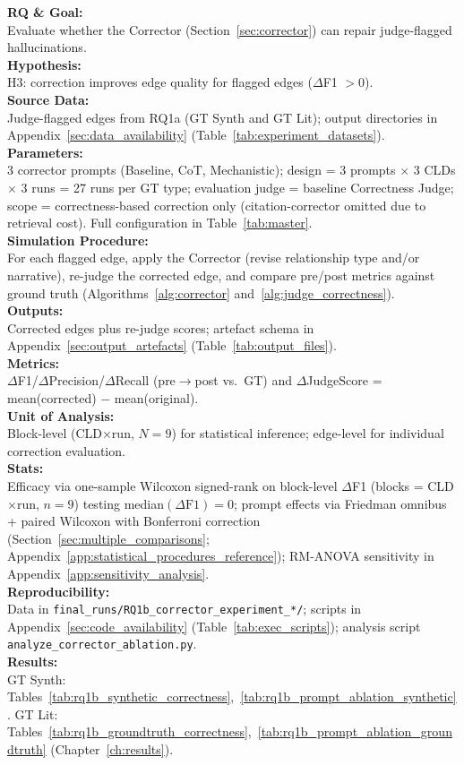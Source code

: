 \noindent\textbf{RQ \& Goal:}\\
Evaluate whether the Corrector (Section~\ref{sec:corrector}) can repair judge-flagged hallucinations.\\
\textbf{Hypothesis:}\\
H3: correction improves edge quality for flagged edges ($\Delta$F1 $> 0$).\\
\textbf{Source Data:}\\
Judge-flagged edges from RQ1a (GT Synth and GT Lit); output directories in Appendix~\ref{sec:data_availability} (Table~\ref{tab:experiment_datasets}).\\
\textbf{Parameters:}\\
3 corrector prompts (Baseline, CoT, Mechanistic); design = 3 prompts $\times$ 3 CLDs $\times$ 3 runs = 27 runs per GT type; evaluation judge = baseline Correctness Judge; scope = correctness-based correction only (citation-corrector omitted due to retrieval cost). Full configuration in Table~\ref{tab:master}.\\
\textbf{Simulation Procedure:}\\
For each flagged edge, apply the Corrector (revise relationship type and/or narrative), re-judge the corrected edge, and compare pre/post metrics against ground truth (Algorithms~\ref{alg:corrector} and~\ref{alg:judge_correctness}).\\
\textbf{Outputs:}\\
Corrected edges plus re-judge scores; artefact schema in Appendix~\ref{sec:output_artefacts} (Table~\ref{tab:output_files}).\\
\textbf{Metrics:}\\
$\Delta$F1/$\Delta$Precision/$\Delta$Recall (pre$\rightarrow$post vs.\ GT) and $\Delta$JudgeScore = mean(corrected) $-$ mean(original).\\
\textbf{Unit of Analysis:}\\
Block-level (CLD$\times$run, $N=9$) for statistical inference; edge-level for individual correction evaluation.\\
\textbf{Stats:}\\
Efficacy via one-sample Wilcoxon signed-rank on block-level $\Delta$F1 (blocks = CLD$\times$run, $n{=}9$) testing median$(\Delta\mathrm{F1})=0$; prompt effects via Friedman omnibus + paired Wilcoxon with Bonferroni correction (Section~\ref{sec:multiple_comparisons}; Appendix~\ref{app:statistical_procedures_reference}); RM-ANOVA sensitivity in Appendix~\ref{app:sensitivity_analysis}.\\
\textbf{Reproducibility:}\\
Data in \texttt{final\_runs/RQ1b\_corrector\_experiment\_*/}; scripts in Appendix~\ref{sec:code_availability} (Table~\ref{tab:exec_scripts}); analysis script \texttt{analyze\_corrector\_ablation.py}.\\
\textbf{Results:}\\
GT Synth: Tables~\ref{tab:rq1b_synthetic_correctness},~\ref{tab:rq1b_prompt_ablation_synthetic}. GT Lit: Tables~\ref{tab:rq1b_groundtruth_correctness},~\ref{tab:rq1b_prompt_ablation_groundtruth} (Chapter~\ref{ch:results}).

